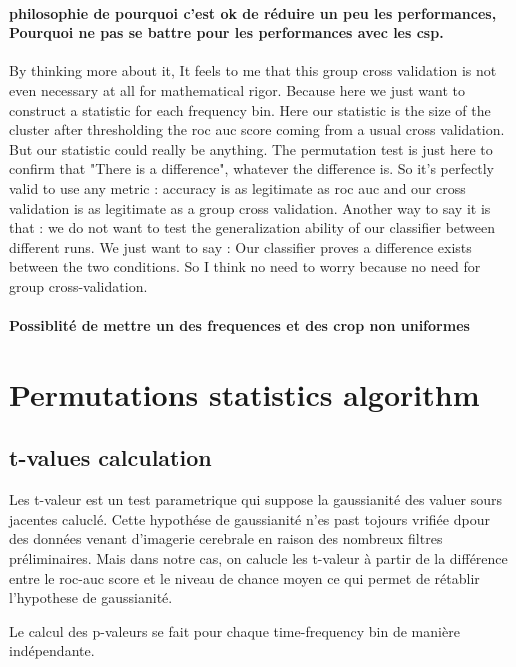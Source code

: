 \paragraph{philosophie de pourquoi c'est ok de réduire un peu les performances, Pourquoi ne pas se battre pour les performances avec les csp.}

By thinking more about it, It feels to me that this group cross validation is not even necessary at all for mathematical rigor. Because here we just want to construct a statistic for each frequency bin. Here our statistic is the size of the cluster after thresholding the roc auc score coming from a usual cross validation. But our statistic could really be anything. The permutation test is just here to confirm that "There is a difference", whatever the difference is. So it's perfectly valid to use any metric : accuracy is as legitimate as roc auc and our cross validation is as legitimate as a group cross validation.
Another way to say it is that : we do not want to test the generalization ability of our classifier between different runs. We just want to say : Our classifier proves a difference exists between the two conditions.
So I think no need to worry because no need for group cross-validation.


\paragraph{Possiblité de mettre un des frequences et des crop non uniformes}




\section{Permutations statistics algorithm}

\subsection{t-values calculation}

Les t-valeur est un test parametrique qui suppose la gaussianité des valuer sours jacentes caluclé. Cette hypothése de gaussianité n'es past tojours vrifiée dpour des données venant d'imagerie cerebrale en raison des nombreux filtres préliminaires. Mais dans notre cas, on calucle les t-valeur à partir de la différence entre le roc-auc score et le niveau de chance moyen ce qui permet de rétablir l'hypothese de gaussianité.

Le calcul des p-valeurs se fait pour chaque time-frequency bin de manière indépendante.

